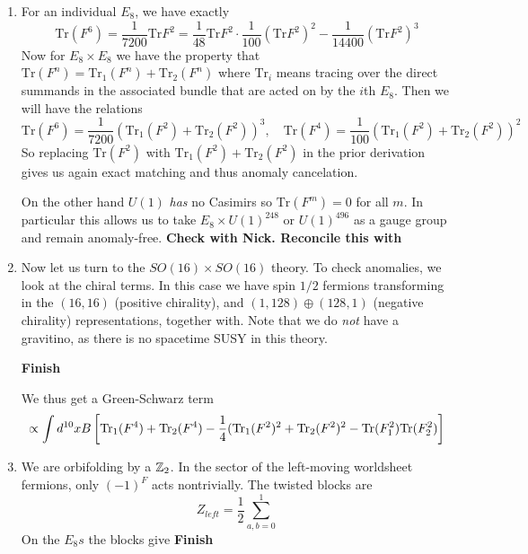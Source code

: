 \documentclass[11pt, class=article, crop=false]{standalone}
\begin{document}
\begin{enumerate}
	\item For an individual $E_8$, we have exactly
	\[
		\mathrm{Tr}(F^6) = \frac{1}{7200} \mathrm{Tr}{F^2} = \frac{1}{48} \mathrm{Tr}{F^2} \cdot \frac{1}{100} (\mathrm{Tr}{F^2})^2 - \frac{1}{14400} (\mathrm{Tr}{F^2})^3
	\]
	Now for $E_8 \times E_8$ we have the property that $\mathrm{Tr}(F^n) = \mathrm{Tr}_1(F^n) + \mathrm{Tr}_2(F^n)$ where $\mathrm{Tr}_i$ means tracing over the direct summands in the associated bundle that are acted on by the $i$th $E_8$. Then we will have the relations
	\[
		\mathrm{Tr}(F^6) = \frac{1}{7200} (\mathrm{Tr}_1(F^2) + \mathrm{Tr}_2(F^2))^3, \quad \mathrm{Tr}(F^4) = \frac{1}{100} (\mathrm{Tr}_1(F^2) + \mathrm{Tr}_2(F^2))^2
	\]
	So replacing $\mathrm{Tr}(F^2)$ with $\mathrm{Tr}_1(F^2) + \mathrm{Tr}_2(F^2)$ in the prior derivation gives us again exact matching and thus anomaly cancelation. 
	
	On the other hand $U(1)$ \emph{has} no Casimirs so $\mathrm{Tr}(F^m) = 0$ for all $m$. In particular this allows us to take $E_8 \times U(1)^{248}$ or $U(1)^{496}$ as a gauge group and remain anomaly-free. \textbf{Check with Nick. Reconcile this with} 
	
	\item Now let us turn to the $SO(16) \times SO(16)$ theory. To check anomalies, we look at the chiral terms. In this case we have spin $1/2$ fermions transforming in the $(16,16)$ (positive chirality), and $(1, 128) \oplus (128, 1)$ (negative chirality) representations, together with. Note that we do \emph{not} have a gravitino, as there is no spacetime SUSY in this theory.

	\textbf{Finish}

	We thus get a Green-Schwarz term
	\[
		\propto \int d^{10} x B \left[\mathrm{Tr}_1 (F^4) + \mathrm{Tr}_2 (F^4) - \frac14 (\mathrm{Tr}_1(F^2)^2 + \mathrm{Tr}_2(F^2)^2 - \mathrm{Tr}(F_1^2) \mathrm{Tr}(F_2^2) \right]
	\]

	\item We are orbifolding by a $\mathbb{Z}_2$. In the sector of the left-moving worldsheet fermions, only $(-1)^F$ acts nontrivially. The twisted blocks are
	\[
		Z_{left} = \frac12 \sum_{a, b = 0}^1
	\]
	On the $E_8s$ the blocks give
	\textbf{Finish}
	
	
\end{enumerate}
	
\end{document}
